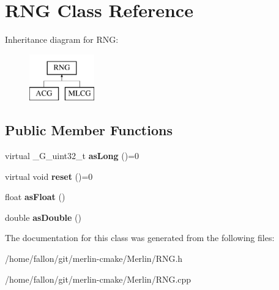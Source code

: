 \hypertarget{classRNG}{}\section{R\+NG Class Reference}
\label{classRNG}
Inheritance diagram for R\+NG\+:\begin{figure}[H]
\begin{center}
\leavevmode
\includegraphics[height=2.000000cm]{classRNG}
\end{center}
\end{figure}
\subsection*{Public Member Functions}
\begin{DoxyCompactItemize}
\item 
\mbox{\label{classRNG_a3ca4f6df2a08eeef9e5167c02419ee65}} 
virtual \+\_\+\+G\+\_\+uint32\+\_\+t {\bfseries as\+Long} ()=0
\item 
\mbox{\label{classRNG_ab56c37d9e11ac58668a8a5b227193b43}} 
virtual void {\bfseries reset} ()=0
\item 
\mbox{\label{classRNG_ab60c118887bc81e10e67986db0f185f1}} 
float {\bfseries as\+Float} ()
\item 
\mbox{\label{classRNG_a317405bbcffe9c9432e99f5ac067fb31}} 
double {\bfseries as\+Double} ()
\end{DoxyCompactItemize}


The documentation for this class was generated from the following files\+:\begin{DoxyCompactItemize}
\item 
/home/fallon/git/merlin-\/cmake/\+Merlin/R\+N\+G.\+h\item 
/home/fallon/git/merlin-\/cmake/\+Merlin/R\+N\+G.\+cpp\end{DoxyCompactItemize}
